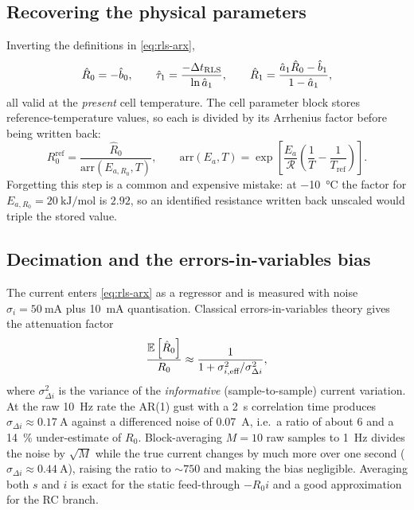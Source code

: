 \subsection{Recovering the physical parameters}
Inverting the definitions in \eqref{eq:rls-arx},
\begin{equation}
\hat{R}_0=-\hat{b}_0,
\qquad
\hat{\tau}_1=\frac{-\Delta t_\text{RLS}}{\ln \hat{a}_1},
\qquad
\hat{R}_1=\frac{\hat{a}_1\hat{R}_0-\hat{b}_1}{1-\hat{a}_1},
\label{eq:rls-recover}
\end{equation}
all valid at the \emph{present} cell temperature.  The cell parameter block stores
reference-temperature values, so each is divided by its Arrhenius factor before being written back:
\begin{equation}
R_0^{\text{ref}}=\frac{\hat{R}_0}{\mathrm{arr}(E_{a,R_0},T)},\qquad
\mathrm{arr}(E_a,T)=\exp\!\left[\frac{E_a}{\mathcal{R}}\left(\frac1T-\frac1{T_\text{ref}}\right)\right].
\label{eq:rls-arr}
\end{equation}
Forgetting this step is a common and expensive mistake: at \SI{-10}{\celsius} the factor for
$E_{a,R_0}=\SI{20}{\kilo\joule\per\mole}$ is $2.92$, so an identified resistance written back
unscaled would triple the stored value.

\subsection{Decimation and the errors-in-variables bias}
\label{sec:rls-decim}
The current enters \eqref{eq:rls-arx} as a regressor and is measured with noise
$\sigma_i=\SI{50}{\milli\ampere}$ plus \SI{10}{\milli\ampere} quantisation.  Classical
errors-in-variables theory gives the attenuation factor
\begin{equation}
\frac{\mathbb{E}\left[\hat{R}_0\right]}{R_0}\approx\frac{1}{1+\sigma^2_{i,\text{eff}}/\sigma^2_{\Delta i}},
\label{eq:rls-eiv}
\end{equation}
where $\sigma^2_{\Delta i}$ is the variance of the \emph{informative} (sample-to-sample) current
variation.  At the raw \SI{10}{\hertz} rate the AR(1) gust with a \SI{2}{\second} correlation time
produces $\sigma_{\Delta i}\approx\SI{0.17}{\ampere}$ against a differenced noise of
\SI{0.07}{\ampere}, i.e.\ a ratio of about $6$ and a \SI{14}{\percent} under-estimate of $R_0$.
Block-averaging $M=10$ raw samples to \SI{1}{\hertz} divides the noise by $\sqrt{M}$ while the true
current changes by much more over one second ($\sigma_{\Delta i}\approx\SI{0.44}{\ampere}$),
raising the ratio to $\sim750$ and making the bias negligible.  Averaging both $s$ and $i$ is exact
for the static feed-through $-R_0 i$ and a good approximation for the RC branch.

